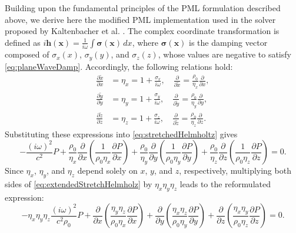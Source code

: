 \documentclass[final,num,12pt]{elsarticle}
\newcommand{\x}{\mathbf{x}}
\newcommand{\h}{\boldsymbol{h}}
\begin{document}
 Building upon the fundamental principles of the PML formulation described above, we derive here the modified PML implementation used in the solver proposed by Kaltenbacher et al. \cite{Kaltenbacher2013modified}.  The complex coordinate transformation is defined as $i\h(\x) = \frac{1}{i\omega}\int \boldsymbol{\sigma}(\x) \,dx$, where $\boldsymbol{\sigma}(\x)$ is the damping vector composed of $\sigma_x(x)$, $\sigma_y(y)$, and $\sigma_z(z)$, whose values are negative to satisfy \cref{eq:planeWaveDamp}. Accordingly, the following relations hold:
 \begin{equation}
     \begin{aligned}
         \frac{\partial \tilde{x}}{\partial x} & = \eta_x=1+\frac{\sigma_x}{i\omega},\quad  \frac{\partial}{\partial \tilde{x}}=\frac{\rho_0}{\eta_x}\frac{\partial}{\partial x},\\
         \frac{\partial \tilde{y}}{\partial y} & = \eta_y=1+\frac{\sigma_y}{i\omega},\quad  \frac{\partial}{\partial \tilde{y}}=\frac{\rho_0}{\eta_y}\frac{\partial}{\partial y}, \\
         \frac{\partial \tilde{z}}{\partial z} & = \eta_z=1+\frac{\sigma_z}{i\omega},\quad  \frac{\partial}{\partial \tilde{z}}=\frac{\rho_0}{\eta_z}\frac{\partial}{\partial z}. 
     \end{aligned}
     \label{eq:dampEtaDef}
 \end{equation}
 Substituting these expressions into \cref{eq:stretchedHelmholtz} gives
 \begin{equation}
     -\frac{(i\omega)^2}{c^2}P + \frac{\rho_0}{\eta_x}\frac{\partial}{\partial x}\left(\frac{1}{\rho_0 \eta_x}\frac{\partial P}{\partial x}\right) + \frac{\rho_0}{\eta_y}\frac{\partial}{\partial y}\left(\frac{1}{\rho_0 \eta_y}\frac{\partial P}{\partial y}\right) +\frac{\rho_0}{\eta_z}\frac{\partial}{\partial z}\left(\frac{1}{\rho_0 \eta_z}\frac{\partial P}{\partial z}\right)=0.
     \label{eq:extendedStretchHelmholz}
 \end{equation}
 Since $\eta_x$, $\eta_y$, and $\eta_z$ depend solely on $x$, $y$, and $z$, respectively, multiplying both sides of \cref{eq:extendedStretchHelmholz} by $\eta_x\eta_y\eta_z$ leads to the reformulated expression:
 \begin{equation}
     -\eta_x\eta_y\eta_z \frac{(i\omega)^2}{c^2 \rho_0}P + \frac{\partial}{\partial x}\left(\frac{\eta_y\eta_z}{\rho_0\eta_x}\frac{\partial P}{\partial x}\right) + \frac{\partial}{\partial y}\left(\frac{\eta_x\eta_z}{\rho_0\eta_y}\frac{\partial P}{\partial y}\right) +\frac{\partial}{\partial z}\left(\frac{\eta_x\eta_y}{\rho_0\eta_z}\frac{\partial P}{\partial z}\right)=0.
     \label{eq:reformedStretchHelmholz}
 \end{equation}
\end{document}
